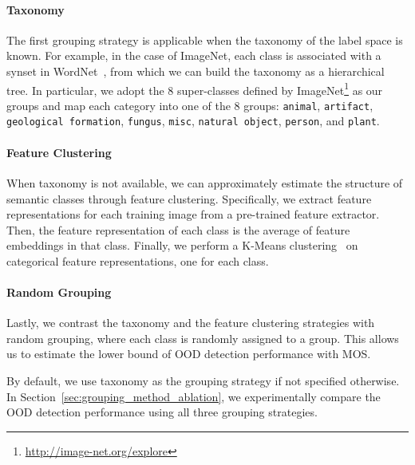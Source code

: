 \documentclass[final]{cvpr}
\begin{document}
\vspace{-0.4cm}
\paragraph{Taxonomy} The first grouping strategy is applicable when the taxonomy of the label space is known. For example, in the case of ImageNet, each class is associated with a synset in WordNet~\cite{miller1995wordnet}, from which we can build the taxonomy as a hierarchical tree. In particular, we adopt the 8 super-classes defined by ImageNet\footnote{\url{http://image-net.org/explore}} as our groups and map each category into one of the 8 groups: \texttt{animal}, \texttt{artifact}, \texttt{geological formation}, \texttt{fungus}, \texttt{misc}, \texttt{natural object}, \texttt{person}, and \texttt{plant}.



\vspace{-0.4cm}
\paragraph{Feature Clustering} When taxonomy is not available, we can approximately estimate the structure of semantic classes through feature clustering. Specifically, we extract feature representations for each training image from a pre-trained feature extractor. Then, the feature representation of each class is the average of feature embeddings in that class. Finally, we perform a K-Means clustering~\cite{macqueen1967some} on categorical feature representations, one for each class.


\vspace{-0.4cm}
\paragraph{Random Grouping} Lastly, we contrast the taxonomy and the feature clustering strategies with random grouping, where each class is randomly assigned to a group. This allows us to estimate the lower bound of OOD detection performance with MOS.

By default, we use taxonomy as the grouping strategy if not specified otherwise. In Section~\ref{sec:grouping_method_ablation}, we experimentally compare the OOD detection performance using all three grouping strategies.  
\end{document}

